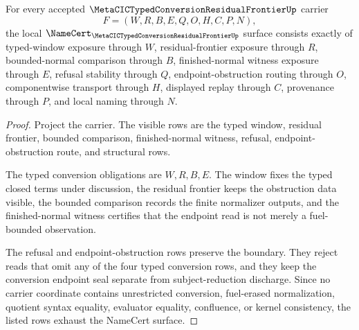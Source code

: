 \begin{theorem}
\label{thm:metacic-typed-conversion-residual-frontier-namecert-obligations}
For every accepted $\MetaCICTypedConversionResidualFrontierUp$ carrier
$$
F=(W,R,B,E,Q,O,H,C,P,N),
$$
the local $\NameCert_{\MetaCICTypedConversionResidualFrontierUp}$ surface consists exactly of typed-window exposure through $W$, residual-frontier exposure through $R$, bounded-normal comparison through $B$, finished-normal witness exposure through $E$, refusal stability through $Q$, endpoint-obstruction routing through $O$, componentwise transport through $H$, displayed replay through $C$, provenance through $P$, and local naming through $N$.
\end{theorem}
\begin{proof}
Project the carrier. The visible rows are the typed window, residual frontier, bounded comparison, finished-normal witness, refusal, endpoint-obstruction route, and structural rows.

The typed conversion obligations are $W,R,B,E$. The window fixes the typed closed terms under discussion, the residual frontier keeps the obstruction data visible, the bounded comparison records the finite normalizer outputs, and the finished-normal witness certifies that the endpoint read is not merely a fuel-bounded observation.

The refusal and endpoint-obstruction rows preserve the boundary. They reject reads that omit any of the four typed conversion rows, and they keep the conversion endpoint seal separate from subject-reduction discharge. Since no carrier coordinate contains unrestricted conversion, fuel-erased normalization, quotient syntax equality, evaluator equality, confluence, or kernel consistency, the listed rows exhaust the NameCert surface.
\end{proof}

